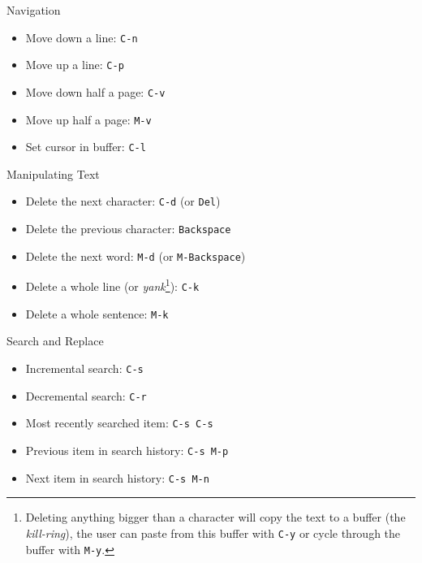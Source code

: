 \documentclass[12pt,a4paper,oneside]{beamer}
\begin{document}
\begin{frame}{Navigation}
\begin{itemize}
  \item Move down a line: \texttt{C-n}\newline
  \item Move up a line: \texttt{C-p}\newline
  \item Move down half a page: \texttt{C-v}\newline
  \item Move up half a page: \texttt{M-v}\newline
  \item Set cursor in buffer: \texttt{C-l}
\end{itemize}
\end{frame}

\begin{frame}{Manipulating Text}
\begin{itemize}
  \item Delete the next character: \texttt{C-d} (or \texttt{Del})\newline
  \item Delete the previous character: \texttt{Backspace}\newline
  \item Delete the next word: \texttt{M-d} (or \texttt{M-Backspace})\newline
  \item Delete a whole line (or \emph{yank}\footnote{Deleting anything bigger than a character will copy the text to a buffer (the \emph{kill-ring}), the user can paste from this buffer with \texttt{C-y} or cycle through the buffer with \texttt{M-y}.}): \texttt{C-k}\newline
  \item Delete a whole sentence: \texttt{M-k}
\end{itemize}
\end{frame}

\begin{frame}{Search and Replace}
\begin{itemize}
  \item Incremental search: \texttt{C-s}\newline
  \item Decremental search: \texttt{C-r}\newline
  \item Most recently searched item: \texttt{C-s C-s}\newline
  \item Previous item in search history: \texttt{C-s M-p}\newline
  \item Next item in search history: \texttt{C-s M-n}
\end{itemize}
\end{frame}
\end{document}

